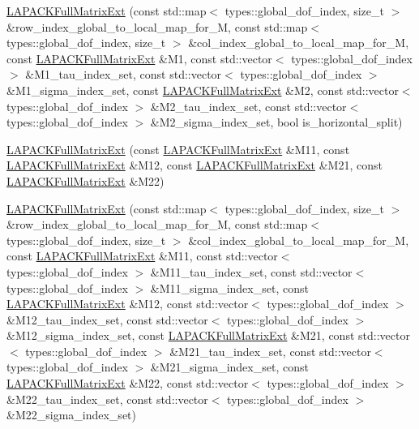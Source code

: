 \begin{DoxyCompactItemize}
\item 
\hyperlink{classLAPACKFullMatrixExt_a1c8c9c59c2edc349031c4867c19067ef}{L\+A\+P\+A\+C\+K\+Full\+Matrix\+Ext} (const std\+::map$<$ types\+::global\+\_\+dof\+\_\+index, size\+\_\+t $>$ \&row\+\_\+index\+\_\+global\+\_\+to\+\_\+local\+\_\+map\+\_\+for\+\_\+M, const std\+::map$<$ types\+::global\+\_\+dof\+\_\+index, size\+\_\+t $>$ \&col\+\_\+index\+\_\+global\+\_\+to\+\_\+local\+\_\+map\+\_\+for\+\_\+M, const \hyperlink{classLAPACKFullMatrixExt}{L\+A\+P\+A\+C\+K\+Full\+Matrix\+Ext} \&M1, const std\+::vector$<$ types\+::global\+\_\+dof\+\_\+index $>$ \&M1\+\_\+tau\+\_\+index\+\_\+set, const std\+::vector$<$ types\+::global\+\_\+dof\+\_\+index $>$ \&M1\+\_\+sigma\+\_\+index\+\_\+set, const \hyperlink{classLAPACKFullMatrixExt}{L\+A\+P\+A\+C\+K\+Full\+Matrix\+Ext} \&M2, const std\+::vector$<$ types\+::global\+\_\+dof\+\_\+index $>$ \&M2\+\_\+tau\+\_\+index\+\_\+set, const std\+::vector$<$ types\+::global\+\_\+dof\+\_\+index $>$ \&M2\+\_\+sigma\+\_\+index\+\_\+set, bool is\+\_\+horizontal\+\_\+split)
\item 
\hyperlink{classLAPACKFullMatrixExt_aa94c466249d0df9e122443c0b6263cf3}{L\+A\+P\+A\+C\+K\+Full\+Matrix\+Ext} (const \hyperlink{classLAPACKFullMatrixExt}{L\+A\+P\+A\+C\+K\+Full\+Matrix\+Ext} \&M11, const \hyperlink{classLAPACKFullMatrixExt}{L\+A\+P\+A\+C\+K\+Full\+Matrix\+Ext} \&M12, const \hyperlink{classLAPACKFullMatrixExt}{L\+A\+P\+A\+C\+K\+Full\+Matrix\+Ext} \&M21, const \hyperlink{classLAPACKFullMatrixExt}{L\+A\+P\+A\+C\+K\+Full\+Matrix\+Ext} \&M22)
\item 
\hyperlink{classLAPACKFullMatrixExt_a4baa5d6642259df28cf9f32cb6b71a25}{L\+A\+P\+A\+C\+K\+Full\+Matrix\+Ext} (const std\+::map$<$ types\+::global\+\_\+dof\+\_\+index, size\+\_\+t $>$ \&row\+\_\+index\+\_\+global\+\_\+to\+\_\+local\+\_\+map\+\_\+for\+\_\+M, const std\+::map$<$ types\+::global\+\_\+dof\+\_\+index, size\+\_\+t $>$ \&col\+\_\+index\+\_\+global\+\_\+to\+\_\+local\+\_\+map\+\_\+for\+\_\+M, const \hyperlink{classLAPACKFullMatrixExt}{L\+A\+P\+A\+C\+K\+Full\+Matrix\+Ext} \&M11, const std\+::vector$<$ types\+::global\+\_\+dof\+\_\+index $>$ \&M11\+\_\+tau\+\_\+index\+\_\+set, const std\+::vector$<$ types\+::global\+\_\+dof\+\_\+index $>$ \&M11\+\_\+sigma\+\_\+index\+\_\+set, const \hyperlink{classLAPACKFullMatrixExt}{L\+A\+P\+A\+C\+K\+Full\+Matrix\+Ext} \&M12, const std\+::vector$<$ types\+::global\+\_\+dof\+\_\+index $>$ \&M12\+\_\+tau\+\_\+index\+\_\+set, const std\+::vector$<$ types\+::global\+\_\+dof\+\_\+index $>$ \&M12\+\_\+sigma\+\_\+index\+\_\+set, const \hyperlink{classLAPACKFullMatrixExt}{L\+A\+P\+A\+C\+K\+Full\+Matrix\+Ext} \&M21, const std\+::vector$<$ types\+::global\+\_\+dof\+\_\+index $>$ \&M21\+\_\+tau\+\_\+index\+\_\+set, const std\+::vector$<$ types\+::global\+\_\+dof\+\_\+index $>$ \&M21\+\_\+sigma\+\_\+index\+\_\+set, const \hyperlink{classLAPACKFullMatrixExt}{L\+A\+P\+A\+C\+K\+Full\+Matrix\+Ext} \&M22, const std\+::vector$<$ types\+::global\+\_\+dof\+\_\+index $>$ \&M22\+\_\+tau\+\_\+index\+\_\+set, const std\+::vector$<$ types\+::global\+\_\+dof\+\_\+index $>$ \&M22\+\_\+sigma\+\_\+index\+\_\+set)

\end{DoxyCompactItemize}
